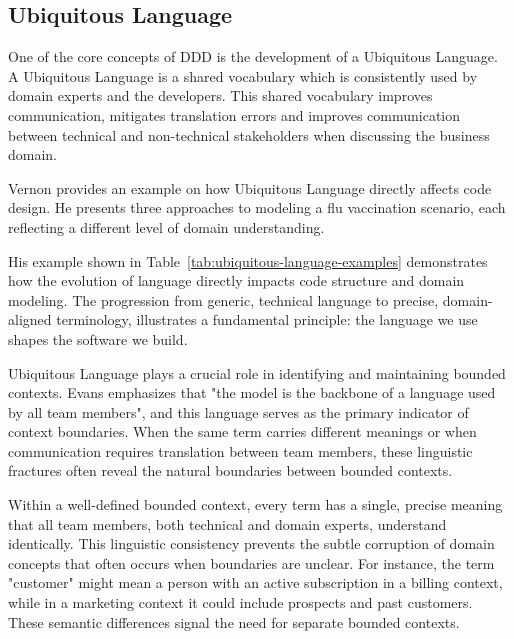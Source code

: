 \subsection{Ubiquitous Language}
One of the core concepts of DDD is the development of a Ubiquitous Language. A Ubiquitous Language is a shared vocabulary which is consistently used by domain experts and the developers. This shared vocabulary improves communication, mitigates translation errors and improves communication between technical and non-technical stakeholders when discussing the business domain.

Vernon \autocite[p.~22]{vernon2013implementing} provides an example on how Ubiquitous Language directly affects code design. He presents three approaches to modeling a flu vaccination scenario, each reflecting a different level of domain understanding.

His example shown in Table~\ref{tab:ubiquitous-language-examples} demonstrates how the evolution of language directly impacts code structure and domain modeling. The progression from generic, technical language to precise, domain-aligned terminology, illustrates a fundamental principle: the language we use shapes the software we build.

Ubiquitous Language plays a crucial role in identifying and maintaining bounded contexts. Evans \autocite[p.~13]{Evans2003} emphasizes that "the model is the backbone of a language used by all team members", and this language serves as the primary indicator of context boundaries. When the same term carries different meanings or when communication requires translation between team members, these linguistic fractures often reveal the natural boundaries between bounded contexts.

Within a well-defined bounded context, every term has a single, precise meaning that all team members, both technical and domain experts, understand identically. This linguistic consistency prevents the subtle corruption of domain concepts that often occurs when boundaries are unclear. For instance, the term "customer" might mean a person with an active subscription in a billing context, while in a marketing context it could include prospects and past customers. These semantic differences signal the need for separate bounded contexts.


